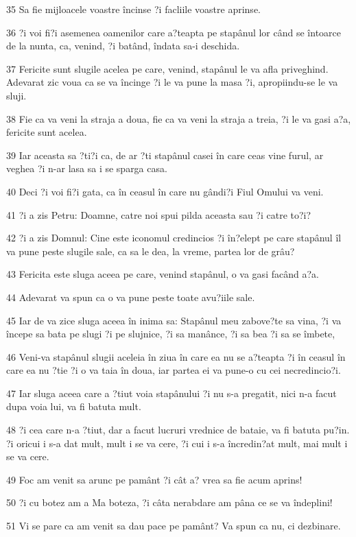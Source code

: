 \par 35 Sa fie mijloacele voastre încinse ?i facliile voastre aprinse.
\par 36 ?i voi fi?i asemenea oamenilor care a?teapta pe stapânul lor când se întoarce de la nunta, ca, venind, ?i batând, îndata sa-i deschida.
\par 37 Fericite sunt slugile acelea pe care, venind, stapânul le va afla priveghind. Adevarat zic voua ca se va încinge ?i le va pune la masa ?i, apropiindu-se le va sluji.
\par 38 Fie ca va veni la straja a doua, fie ca va veni la straja a treia, ?i le va gasi a?a, fericite sunt acelea.
\par 39 Iar aceasta sa ?ti?i ca, de ar ?ti stapânul casei în care ceas vine furul, ar veghea ?i n-ar lasa sa i se sparga casa.
\par 40 Deci ?i voi fi?i gata, ca în ceasul în care nu gândi?i Fiul Omului va veni.
\par 41 ?i a zis Petru: Doamne, catre noi spui pilda aceasta sau ?i catre to?i?
\par 42 ?i a zis Domnul: Cine este iconomul credincios ?i în?elept pe care stapânul îl va pune peste slugile sale, ca sa le dea, la vreme, partea lor de grâu?
\par 43 Fericita este sluga aceea pe care, venind stapânul, o va gasi facând a?a.
\par 44 Adevarat va spun ca o va pune peste toate avu?iile sale.
\par 45 Iar de va zice sluga aceea în inima sa: Stapânul meu zabove?te sa vina, ?i va începe sa bata pe slugi ?i pe slujnice, ?i sa manânce, ?i sa bea ?i sa se îmbete,
\par 46 Veni-va stapânul slugii aceleia în ziua în care ea nu se a?teapta ?i în ceasul în care ea nu ?tie ?i o va taia în doua, iar partea ei va pune-o cu cei necredincio?i.
\par 47 Iar sluga aceea care a ?tiut voia stapânului ?i nu s-a pregatit, nici n-a facut dupa voia lui, va fi batuta mult.
\par 48 ?i cea care n-a ?tiut, dar a facut lucruri vrednice de bataie, va fi batuta pu?in. ?i oricui i s-a dat mult, mult i se va cere, ?i cui i s-a încredin?at mult, mai mult i se va cere.
\par 49 Foc am venit sa arunc pe pamânt ?i cât a? vrea sa fie acum aprins!
\par 50 ?i cu botez am a Ma boteza, ?i câta nerabdare am pâna ce se va îndeplini!
\par 51 Vi se pare ca am venit sa dau pace pe pamânt? Va spun ca nu, ci dezbinare.
